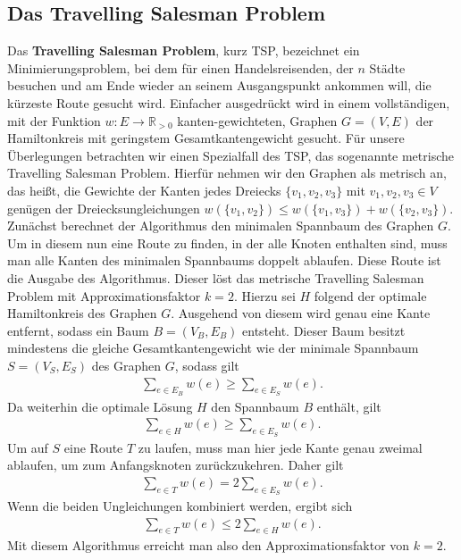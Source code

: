\subsection{Das Travelling Salesman Problem}
Das \textbf{Travelling Salesman Problem}, kurz TSP, bezeichnet ein Minimierungsproblem, bei dem für einen Handelsreisenden, der $n$ Städte besuchen und am Ende wieder an seinem Ausgangspunkt ankommen will, die kürzeste Route gesucht wird. Einfacher ausgedrückt wird in einem vollständigen, mit der Funktion $w:E\rightarrow \mathbb{R}_{>0}$ kanten-gewichteten, Graphen $G=(V,E)$ der Hamiltonkreis mit geringstem Gesamtkantengewicht gesucht.
Für unsere Überlegungen betrachten wir einen Spezialfall des TSP, das sogenannte metrische Travelling Salesman Problem. Hierfür nehmen wir den Graphen als metrisch an, das heißt, die Gewichte der Kanten jedes Dreiecks $\{v_1,v_2,v_3\}$ mit $v_1,v_2,v_3\in V$ genügen der Dreiecksungleichungen $w(\{v_1,v_2\})\leq w(\{v_1,v_3\})+w(\{v_2,v_3\})$. Zunächst berechnet der Algorithmus den minimalen Spannbaum des Graphen $G$. Um in diesem nun eine Route zu finden, in der alle Knoten enthalten sind, muss man alle Kanten des minimalen Spannbaums doppelt ablaufen. Diese Route ist die Ausgabe des Algorithmus.
Dieser löst das metrische Travelling Salesman Problem mit Approximationsfaktor $k=2$. Hierzu sei $H$ folgend der optimale Hamiltonkreis  des Graphen $G$. Ausgehend von diesem wird genau eine Kante entfernt, sodass ein Baum $B=(V_B,E_B)$ entsteht. Dieser Baum besitzt mindestens die gleiche Gesamtkantengewicht wie der minimale Spannbaum $S=(V_{S},E_{S})$ des Graphen $G$, sodass gilt 
\begin{align*}
\sum\limits_{e\in E_B}w(e)\geq \sum\limits_{e\in E_{S}}w(e).
\end{align*}
Da weiterhin die optimale Lösung $H$ den Spannbaum $B$ enthält, gilt
\begin{align*}
\sum\limits_{e\in H}w(e)\geq \sum\limits_{e\in E_{S}}w(e).
\end{align*}
 Um auf $S$ eine Route $T$ zu laufen, muss man hier jede Kante genau zweimal ablaufen, um zum Anfangsknoten zurückzukehren. Daher gilt
\begin{align*}
\sum\limits_{e\in T}w(e)=2 \sum\limits_{e\in E_{S}}w(e).
\end{align*}
Wenn die beiden Ungleichungen kombiniert werden, ergibt sich
\begin{align*}
\sum\limits_{e\in T}w(e)\leq 2 \sum\limits_{e\in H}w(e).
\end{align*}
Mit diesem Algorithmus erreicht man also den Approximationsfaktor von $k=2$.

